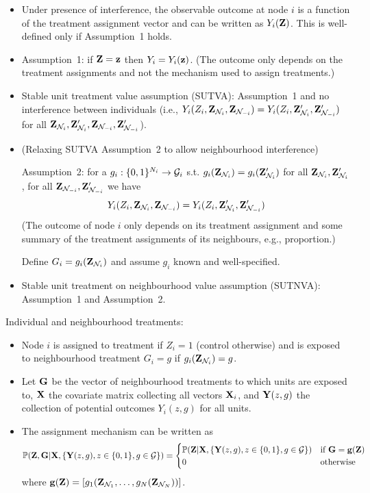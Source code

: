 \documentclass[10pt]{article}
\begin{document}
\begin{itemize}

\item
Under presence of interference, the observable outcome at node $i$ is a function of the treatment assignment vector and can be written as $Y_i(\mathbf{Z})$. This is well-defined only if Assumption~1 holds.

\item
Assumption~1: if $\mathbf{Z}=\mathbf{z}$ then $Y_i=Y_i(\mathbf{z})$. (The outcome only depends on the treatment assignments and not the mechanism used to assign treatments.)

\item
Stable unit treatment value assumption (SUTVA): Assumption~1 and no interference between individuals (i.e., $Y_i(Z_i,\mathbf{Z}_{\mathcal{N}_i},\mathbf{Z}_{\mathcal{N}_{-i}})=Y_i(Z_i,\mathbf{Z}_{\mathcal{N}_i}',\mathbf{Z}_{\mathcal{N}_{-i}}')$ for all $\mathbf{Z}_{\mathcal{N}_i},\mathbf{Z}_{\mathcal{N}_i}',\mathbf{Z}_{\mathcal{N}_{-i}},\mathbf{Z}_{\mathcal{N}_{-i}}'$).

\item
(Relaxing SUTVA Assumption~2 to allow neighbourhood interference)

Assumption~2: for a $g_i:\{0,1\}^{N_i}\rightarrow \mathcal{G}_i$ s.t. $g_i(\mathbf{Z}_{\mathcal{N}_i})=g_i(\mathbf{Z}_{\mathcal{N}_i}')$ for all $\mathbf{Z}_{\mathcal{N}_i},\mathbf{Z}_{\mathcal{N}_i}'$, for all $\mathbf{Z}_{\mathcal{N}_{-i}},\mathbf{Z}_{\mathcal{N}_{-i}}'$ we have
\[
Y_i(Z_i,\mathbf{Z}_{\mathcal{N}_i},\mathbf{Z}_{\mathcal{N}_{-i}}) = Y_i(Z_i,\mathbf{Z}_{\mathcal{N}_i}',\mathbf{Z}_{\mathcal{N}_{-i}}')
\]
(The outcome of node $i$ only depends on its treatment assignment and some summary of the treatment assignments of its neighbours, e.g., proportion.)

Define $G_i=g_i(\mathbf{Z}_{\mathcal{N}_i})$ and assume $g_i$ known and well-specified.

\item
Stable unit treatment on neighbourhood value assumption (SUTNVA): Assumption~1 and Assumption~2.

\end{itemize}

Individual and neighbourhood treatments:

\begin{itemize}

\item
Node $i$ is assigned to treatment if $Z_i=1$ (control otherwise) and is exposed to neighbourhood treatment $G_i=g$ if $g_i(\mathbf{Z}_{\mathcal{N}_i})=g$.

\item
Let $\mathbf{G}$ be the vector of neighbourhood treatments to which units are exposed to, $\mathbf{X}$ the covariate matrix collecting all vectors $\mathbf{X}_i$, and $\mathbf{Y}(z,g)$ the collection of potential outcomes $Y_i(z,g)$ for all units.

\item
The assignment mechanism can be written as
\[
\mathbb{P}(\mathbf{Z},\mathbf{G}|\mathbf{X},\{\mathbf{Y}(z,g),z\in\{0,1\},g\in\mathcal{G}\}) =
\begin{cases}
\mathbb{P}(\mathbf{Z}|\mathbf{X},\{\mathbf{Y}(z,g),z\in\{0,1\},g\in\mathcal{G}\}) & \text{if } \mathbf{G}=\mathbf{g}(\mathbf{Z}) \\
0 & \text{otherwise}
\end{cases}
\]
where $\mathbf{g}(\mathbf{Z})=[g_1(\mathbf{Z}_{\mathcal{N}_1},\ldots,g_N(\mathbf{Z}_{\mathcal{N}_N}))]$.

\end{itemize}
\end{document}
